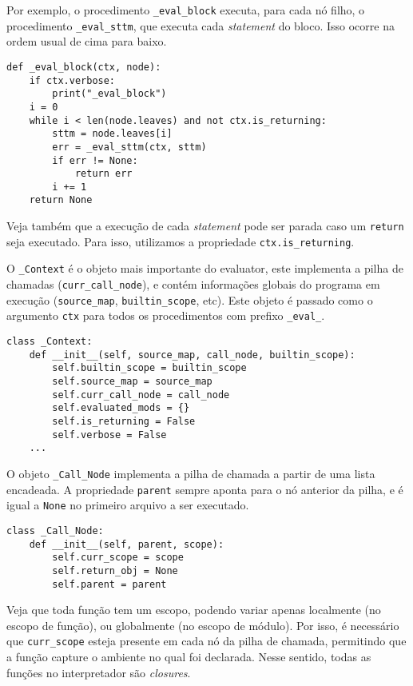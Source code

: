 Por exemplo, o procedimento \verb|_eval_block| executa,
para cada nó filho, o procedimento \verb|_eval_sttm|,
que executa cada \textit{statement} do bloco. Isso ocorre
na ordem usual de cima para baixo.

\begin{lstlisting}
def _eval_block(ctx, node):
    if ctx.verbose:
        print("_eval_block")
    i = 0
    while i < len(node.leaves) and not ctx.is_returning:
        sttm = node.leaves[i]
        err = _eval_sttm(ctx, sttm)
        if err != None:
            return err
        i += 1
    return None
\end{lstlisting}

\noindent Veja também que a execução de cada \textit{statement}
pode ser parada caso um \verb|return| seja executado. Para isso,
utilizamos a propriedade \verb|ctx.is_returning|.

O \verb|_Context| é o objeto mais importante do evaluator,
este implementa a pilha de chamadas (\verb|curr_call_node|),
e contém informações globais do programa em execução
(\verb|source_map|, \verb|builtin_scope|, etc). Este objeto
é passado como o argumento \verb|ctx| para todos os
procedimentos com prefixo \verb|_eval_|.

\begin{lstlisting}
class _Context:
    def __init__(self, source_map, call_node, builtin_scope):
        self.builtin_scope = builtin_scope
        self.source_map = source_map
        self.curr_call_node = call_node
        self.evaluated_mods = {}
        self.is_returning = False
        self.verbose = False
    ...
\end{lstlisting}

 
O objeto \verb|_Call_Node| implementa a pilha de chamada
a partir de uma lista encadeada. A propriedade \verb|parent|
sempre aponta para o nó anterior da pilha, e é igual a
\verb|None| no primeiro arquivo a ser executado.

\begin{lstlisting}
class _Call_Node:
    def __init__(self, parent, scope):
        self.curr_scope = scope
        self.return_obj = None
        self.parent = parent
\end{lstlisting}

\noindent Veja que toda função tem um escopo, podendo
variar apenas localmente (no escopo de função),
ou globalmente (no escopo de módulo). Por isso, é necessário
que \verb|curr_scope| esteja presente em cada nó da pilha
de chamada, permitindo que a função capture o ambiente
no qual foi declarada. Nesse sentido, todas as funções
no interpretador são \textit{closures}.

